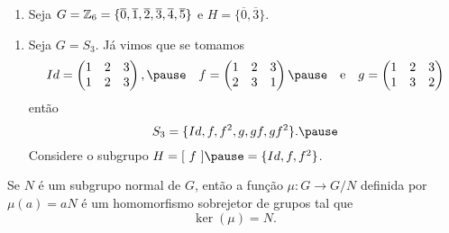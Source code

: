 \documentclass{beamer}
\begin{document}
    \begin{frame}
        \begin{exemplos}
            \begin{enumerate}[label=({\arabic*})]
                \conti

                \item Seja $G = \mathbb{Z}_6 = \{\overline{0}, \overline{1}, \overline{2}, \overline{3}, \overline{4}, \overline{5}\}$ \pause e $H = \{\overline{0}, \overline{3}\}$.

                \seti
            \end{enumerate}
        \end{exemplos}
    \end{frame}

    \begin{frame}
        \begin{exemplos}
            \begin{enumerate}[label=({\arabic*})]
                \conti

                \item Seja $G = S_3$. \pause Já vimos que se tomamos
                \[
                    Id = \begin{pmatrix}
                        1 & 2 & 3\\
                        1 & 2 & 3
                    \end{pmatrix}, \pause\quad
                    f = \begin{pmatrix}
                        1 & 2 & 3\\
                        2 & 3 & 1
                    \end{pmatrix} \pause \quad \mbox{e}\quad
                    g = \begin{pmatrix}
                        1 & 2 & 3\\
                        1 & 3 & 2
                    \end{pmatrix}
                \]
                então
                \[
                    S_3 = \{Id, f, f^2, g, gf, gf^2\}. \pause
                \]
                Considere o subgrupo $H = [\ f\ ] \pause = \{Id, f, f^2\}$.

                \seti
            \end{enumerate}
        \end{exemplos}
    \end{frame}

    \begin{frame}
        \begin{proposicao}
            Se $N$ é um subgrupo normal de $G$, \pause então a função $\mu : G \to G/N$ \pause definida por $\mu(a) = aN$ \pause é um homomorfismo sobrejetor \pause de grupos tal que \pause
            \[
                \ker(\mu) = N.
            \]
        \end{proposicao}
    \end{frame}
\end{document}
